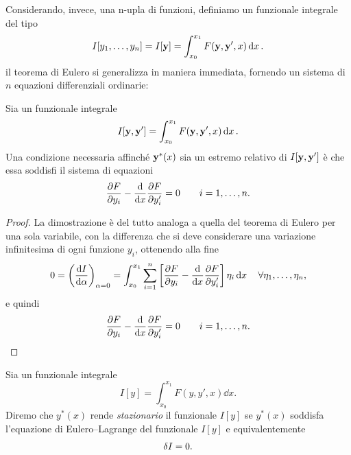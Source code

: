 Considerando, invece, una n-upla di funzioni, definiamo un funzionale integrale del tipo
\begin{equation*}
    I[y_1, \dots, y_n] = I[\vb{y}]= \int_{x_0}^{x_1} F(\vb{y}, \vb{y}', x)\dd{x}.
\end{equation*}
il teorema di Eulero si generalizza in maniera immediata, fornendo un sistema di $n$ equazioni differenziali ordinarie:
\begin{theorem}
    Sia un funzionale integrale
    \begin{equation*}
        I[\vb{y}, \vb{y}'] = \int_{x_0}^{x_1} F(\vb{y}, \vb{y}', x)\dd{x}.
    \end{equation*}
    Una condizione necessaria affinché $\vb{y}^*(x)$ sia un estremo relativo di $I[\vb{y}, \vb{y}']$ è che essa soddisfi il sistema di equazioni
    \begin{equation*}
        \pdv{F}{y_i} - \dv{x}\pdv{F}{y_i'} = 0 \qquad i = 1, \dots, n.
    \end{equation*}
\end{theorem}
\begin{proof}
    La dimostrazione è del tutto analoga a quella del teorema di Eulero per una sola variabile, con la differenza che si deve considerare una variazione infinitesima di ogni funzione $y_i$, ottenendo alla fine
    \begin{equation*}
        0 = \left(\dv{I}{\alpha}\right)_{\alpha=0} = \int_{x_0}^{x_1} \sum_{i=1}^n \left[\pdv{F}{y_i} - \dv{x}\pdv{F}{y_i'}\right] \eta_i \dd{x} \quad \forall \eta_1, \dots, \eta_n,
    \end{equation*}
    e quindi
    \begin{equation*}
        \pdv{F}{y_i} - \dv{x}\pdv{F}{y_i'} = 0 \qquad i = 1, \dots, n.
    \end{equation*}
\end{proof}

\begin{definition}
    Sia un funzionale integrale
    \begin{equation*}
        I[y] = \int_{x_0}^{x_1} F(y, y', x)\dd{x}.
    \end{equation*}
    Diremo che $y^*(x)$ rende \emph{stazionario} il funzionale $I[y]$ se $y^*(x)$ soddisfa l'equazione di Eulero--Lagrange del funzionale $I[y]$ e equivalentemente
    \begin{equation*}
        \var{I} = 0.
    \end{equation*}
\end{definition}

